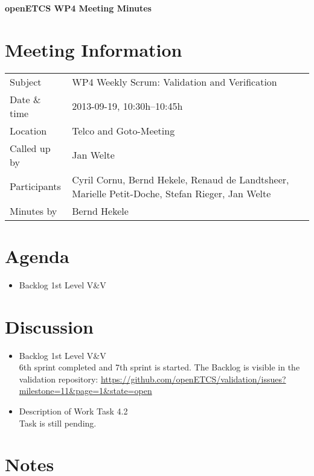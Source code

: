 \documentclass[a4paper, 11pt]{article}
\begin{document}
{\begin{center}\huge\bf openETCS WP4 Meeting Minutes\end{center}}
\section{Meeting Information}

\renewcommand{\arraystretch}{1.5}
\begin{supertabular}{m{.2\textwidth}m{.8\textwidth}}
Subject & WP4 Weekly Scrum: Validation and Verification\\
Date \& time & 2013-09-19, 10:30h--10:45h\\
Location & Telco and Goto-Meeting\\
Called up by & Jan Welte\\
Participants &
Cyril Cornu,
Bernd Hekele,
Renaud de Landtsheer,
Marielle Petit-Doche,
Stefan Rieger,
Jan Welte
\\

Minutes by & Bernd Hekele\\

\end{supertabular}
\renewcommand{\arraystretch}{1.0}


\section{{Agenda}}
\begin{itemize}
\item Backlog 1st Level V\&V
\end{itemize}

\section{Discussion}

\begin{itemize}
\item Backlog 1st Level V\&V\\
6th sprint completed and 7th sprint is started. 
The Backlog is visible in the validation repository:
\url{https://github.com/openETCS/validation/issues?milestone=11&page=1&state=open}\\

\item Description of Work Task 4.2\\
Task is still pending. 


\end{itemize}


\section{Notes}
\end{document}
